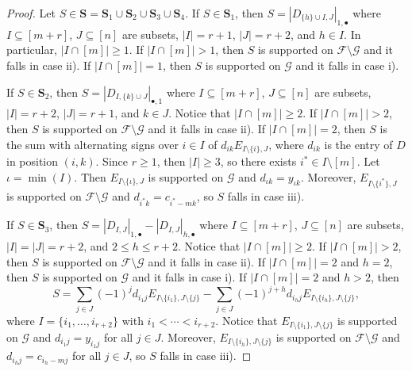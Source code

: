 \documentclass[utf8,latin1]{article}
\newcommand{\abs}[1]{\ensuremath{\left\lvert #1 \right\rvert}}
\begin{document}
\begin{proof}
Let $S\in\mathbf{S}=\mathbf{S}_1\cup\mathbf{S}_2\cup\mathbf{S}_3\cup\mathbf{S}_4$.
If $S\in \mathbf{S}_1$, then $S=\abs{D_{\{h\}\cup I, J}}_{1,\bullet}$ where $I\subseteq[m+r]$, $J\subseteq[n]$ are subsets, $\abs{I}=r+1$, $\abs{J} = r+2$, and $h \in I$. 
In particular, $\abs{I\cap [m]}\ge 1$.
If $\abs{I\cap [m]}>1$, then $S$ is supported on $\mathcal{F}\setminus \mathcal{G}$ and it falls in case ii).
If $\abs{I\cap [m]}=1$, then $S$ is supported on $\mathcal{G}$ and it falls in case i).

If $S\in\mathbf{S}_2$, then $S=\abs{D_{I, \{k\}\cup J}}_{\bullet,1}$ where $I\subseteq[m+r]$, $J\subseteq[n]$ are subsets, $\abs{I} =r+2$, $\abs{J} = r+1$, and $k \in J$. Notice that $\abs{I\cap [m]}\ge 2$.
If $\abs{I\cap [m]}>2$, then $S$ is supported on $\mathcal{F}\setminus \mathcal{G}$ and it falls in case ii).
If $\abs{I\cap [m]}=2$, then $S$ is the sum with alternating signs over $i\in I$ of $d_{i k}E_{I\setminus \{i\},J}$, where $d_{i k}$ is the entry of $D$ in position $(i,k)$. Since $r\geq 1$, then $|I|\geq 3$, so there exists $i^*\in I\setminus[m]$. Let $\iota=\min(I)$. Then $E_{I\setminus \{\iota\},J}$ is supported on $\mathcal{G}$ and $d_{\iota k}=y_{\iota k}$. Moreover, $E_{I\setminus \{i^*\},J}$ is supported on $\mathcal{F}\setminus\mathcal{G}$ and $d_{i^* k} = c_{i^*-m k}$, so $S$ falls in case iii).

If $S\in \mathbf{S}_3$, then  $S=\abs{D_{I,J}}_{1,\bullet} - \abs{D_{I,J}}_{h,\bullet}$ where $I\subseteq[m+r]$, $J\subseteq[n]$ are subsets, $\abs{I}= \abs{J} =r+2 $, and $2\le h\le r+2$.
Notice that $\abs{I\cap [m]}\ge 2$.
If $\abs{I\cap [m]}>2$, then $S$ is supported on $\mathcal{F}\setminus \mathcal{G}$ and it falls in case ii).
If $\abs{I\cap [m]}=2$ and $h=2$, then $S$ is supported on $\mathcal{G}$ and it falls in case i).
If $\abs{I\cap [m]}=2$ and $h>2$, then 
\[S = \sum_{j\in J} (-1)^j d_{i_1 j}E_{I\setminus \{i_1\},J\setminus \{j\}} - \sum_{j\in J} (-1)^{j+h} d_{i_h j}E_{I\setminus \{i_h\},J\setminus \{j\}},\]
where $I=\{i_1,\ldots,i_{r+2}\}$ with $i_1<\cdots<i_{r+2}$.
Notice that $E_{I\setminus \{i_1\},J\setminus \{j\}}$ is supported on $\mathcal{G}$ and $d_{i_1 j} = y_{i_1 j}$ for all $j\in J$.
Moreover, $E_{I\setminus \{i_h\},J\setminus \{j\}}$ is supported on $\mathcal{F}\setminus\mathcal{G}$ and $d_{i_h j} = c_{i_h-m j}$ for all $j\in J$, so $S$ falls in case iii).


\end{proof}
\end{document}
